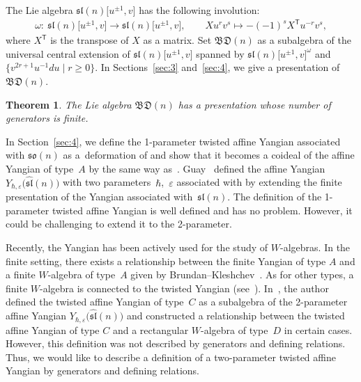 \documentclass[pdftex]{sigma}
\numberwithin{equation}{section}
\newtheorem{Theorem}{Theorem}[section]
\theoremstyle{definition}
\newcommand{\ve}{\varepsilon}
\begin{document}
The Lie algebra $\mathfrak{sl}(n)\bigl[u^{\pm1},v\bigr]$ has the following involution:
\begin{align*}
\omega\colon\ \mathfrak{sl}(n)\bigl[u^{\pm1},v\bigr]\to\mathfrak{sl}(n)\bigl[u^{\pm1},v\bigr],\qquad Xu^rv^s\mapsto -(-1)^sX^{\mathsf{T}}u^{-r}v^s,
\end{align*}
where $X^{\mathsf{T}}$ is the transpose of $X$ as a matrix. Set $\mathfrak{BD}(n)$ as a subalgebra of the universal central extension of $\mathfrak{sl}(n)\bigl[u^{\pm1},v\bigr]$ spanned by $\mathfrak{sl}(n)\bigl[u^{\pm1},v\bigr]^\omega$ and $\bigl\{v^{2r+1}u^{-1}{d}u\mid r\geq0\bigr\}$. In Sections~\ref{sec:3} and~\ref{sec:4}, we give a presentation of $\mathfrak{BD}(n)$.
\begin{Theorem}
The Lie algebra $\mathfrak{BD}(n)$ has a presentation whose number of generators is finite.
\end{Theorem}
In Section~\ref{sec:4}, we define the 1-parameter twisted affine Yangian associated with $\mathfrak{so}(n)$ as a~deformation of  and show that it becomes a coideal of the affine Yangian of type~$A$ by the same way as~\cite{L}.
Guay~\cite{Gu1} defined the affine Yangian $Y_{\hbar,\ve}\bigl(\widehat{\mathfrak{sl}}(n)\bigr)$ with two parameters~$\hbar$,~$\ve$ associated with  by extending the finite presentation of the Yangian associated with~$\mathfrak{sl}(n)$. The definition of the 1-parameter twisted affine Yangian is well defined and has no problem. However, it could be challenging to extend it to the 2-parameter.

Recently, the Yangian has been actively used for the study of $W$-algebras. In the finite setting, there exists a relationship between the finite Yangian of type $A$ and a finite $W$-algebra of type~$A$ given by Brundan--Kleshchev~\cite{BK}. As for other types, a finite $W$-algebra is connected to the twisted Yangian (see~\cite{Bro,DKV,LPTTW}). In~\cite{U77}, the author defined the twisted affine Yangian of type~$C$ as a subalgebra of the 2-parameter affine Yangian $Y_{\hbar,\ve}\bigl(\widehat{\mathfrak{sl}}(n)\bigr)$ and constructed a relationship between the twisted affine Yangian of type $C$ and a rectangular $W$-algebra of type~$D$ in certain cases. However, this definition was not described by generators and defining relations. Thus, we would like to describe a definition of a two-parameter twisted affine Yangian by generators and defining relations.
\end{document}
